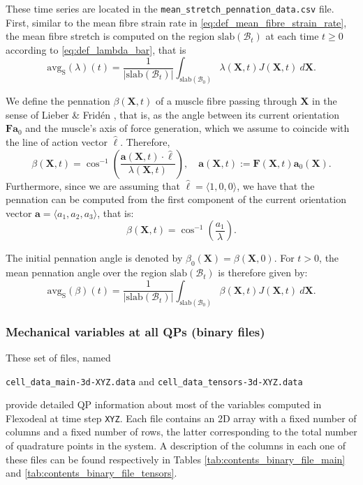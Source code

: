 \documentclass{sfuthesis}
\numberwithin{equation}{section}
\numberwithin{figure}{chapter}
\numberwithin{table}{chapter}
\theoremstyle{definition}
\def\*#1{{\mathbf{#1}}} %
\newcommand{\B}{\mathcal{B}}
\begin{document}
These time series are located in the \texttt{mean\_stretch\_pennation\_data.csv} file. First, similar to the mean fibre strain rate in \eqref{eq:def_mean_fibre_strain_rate}, the mean fibre stretch is computed on the region $\mathrm{slab}(\B_t)$ at each time $t \geq 0$ according to \eqref{eq:def_lambda_bar}, that is
\begin{equation} \label{eq:def_mean_fibre_stretch}
    \mathrm{avg}_\mathrm{S}(\lambda)(t) = \dfrac{1}{|\mathrm{slab}(\B_t)|} \int_{\mathrm{slab}(\B_0)} \lambda(\*X,t) J(\*X,t) \ d\*X.
\end{equation}

We define the pennation $\beta(\*X,t)$ of a muscle fibre passing through $\*X$  in the sense of Lieber \& Frid\'{e}n \cite{LieberFriden2000}, that is, as the angle between its current orientation $\*F \*a_0$ and the muscle's axis of force generation, which we assume to coincide with the line of action vector $\widehat{\bm{\ell}}$. Therefore,
\begin{equation}
    \beta(\*X,t) = \cos^{-1} \left( \dfrac{\*a(\*X,t) \cdot \widehat{\bm{\ell}}}{\lambda(\*X,t)} \right), \quad \*a(\*X,t) := \*F(\*X,t) \*a_0(\*X).
\end{equation}
Furthermore, since we are assuming that $\widehat{\bm{\ell}} = \langle 1,0,0 \rangle$, we have that the pennation can be computed from the first component of the current orientation vector $\*a = \langle a_1,a_2,a_3 \rangle$, that is:
\begin{equation}
    \beta(\*X,t) = \cos^{-1} \left( \dfrac{a_1}{\lambda} \right).
\end{equation}

The initial pennation angle is denoted by $\beta_0(\*X) = \beta(\*X,0)$. For $t>0$, the mean pennation angle over the region $\mathrm{slab}(\B_t)$ is therefore given by:
\begin{equation} \label{eq:def_mean_fibre_pennation}
    \mathrm{avg}_\mathrm{S}(\beta)(t) = \dfrac{1}{|\mathrm{slab}(\B_t)|} \int_{\mathrm{slab}(\B_0)} \beta(\*X,t) J(\*X,t) \ d\*X.
\end{equation}

\subsubsection{Mechanical variables at all QPs (binary files)} \label{sec:binary_files}

These set of files, named 
\begin{center}
    \texttt{cell\_data\_main-3d-XYZ.data} and \texttt{cell\_data\_tensors-3d-XYZ.data}    
\end{center}
provide detailed QP information about most of the variables computed in Flexodeal at time step \texttt{XYZ}. Each file contains an 2D array with a fixed number of columns and a fixed number of rows, the latter corresponding to the total number of quadrature points in the system. A description of the columns in each one of these files can be found respectively in Tables \ref{tab:contents_binary_file_main} and \ref{tab:contents_binary_file_tensors}.
\end{document}
